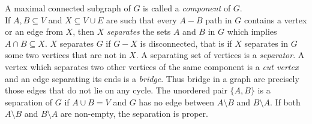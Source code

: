 \documentclass[12pt]{report}
\begin{document}
 A maximal connected subgraph of $G$ is called a {\em component} of $G$.\\
If $A, B\subseteq V$ and $X\subseteq V\cup E$ are such that every
$A-B$ path in $G$ contains a vertex or an edge from $X$, then $X$
{\em separates} the sets $A$ and $B$ in $G$ which implies $A\cap
B\subseteq X$.
 $X$ separates $G$ if $G-X$ is disconnected, that is if $X$ separates in $G$ some two vertices that are not in $X$.
A separating set of vertices is a {\em separator}. A vertex which
separates two other vertices of the same component is a {\em cut
vertex }and an edge separating its ends is a {\em bridge}. Thus
bridge in a graph are precisely those edges that do not lie on any
cycle.
The unordered pair $\{A,B\}$  is a separation of $G$ if $A\cup B=V$ and $G$ has no edge between $A\setminus B$ and $B\setminus A$. If both $A\setminus B$ and $B\setminus A$ are non-empty, the separation is proper.\\
\end{document}
